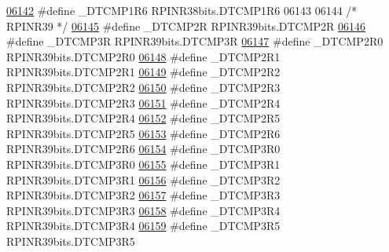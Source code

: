 \begin{DoxyCode}
\hypertarget{a00009_source_l06142}{}\hyperlink{a00009_a85c02708ed7aea8b18ad48ced7119c7e}{06142} \textcolor{preprocessor}{#define \_DTCMP1R6 RPINR38bits.DTCMP1R6}
06143 
06144 \textcolor{comment}{/* RPINR39 */}
\hypertarget{a00009_source_l06145}{}\hyperlink{a00009_abf4ddf38f361369065e1a7c2a2249b88}{06145} \textcolor{preprocessor}{#define \_DTCMP2R RPINR39bits.DTCMP2R}
\hypertarget{a00009_source_l06146}{}\hyperlink{a00009_ae1fca6ff210576b064e192b44a67b58f}{06146} \textcolor{preprocessor}{#define \_DTCMP3R RPINR39bits.DTCMP3R}
\hypertarget{a00009_source_l06147}{}\hyperlink{a00009_a2419cc0ce09311f6ce944ead78e2d6ac}{06147} \textcolor{preprocessor}{#define \_DTCMP2R0 RPINR39bits.DTCMP2R0}
\hypertarget{a00009_source_l06148}{}\hyperlink{a00009_a6d44d57831c926526ff5bb8f54c1d809}{06148} \textcolor{preprocessor}{#define \_DTCMP2R1 RPINR39bits.DTCMP2R1}
\hypertarget{a00009_source_l06149}{}\hyperlink{a00009_a4ef6402109846d1217ddc941f459c81c}{06149} \textcolor{preprocessor}{#define \_DTCMP2R2 RPINR39bits.DTCMP2R2}
\hypertarget{a00009_source_l06150}{}\hyperlink{a00009_ab7769feccd2440416945ab13f53d543f}{06150} \textcolor{preprocessor}{#define \_DTCMP2R3 RPINR39bits.DTCMP2R3}
\hypertarget{a00009_source_l06151}{}\hyperlink{a00009_ae90b7f8ab40564d4935fa89eb7dc3abc}{06151} \textcolor{preprocessor}{#define \_DTCMP2R4 RPINR39bits.DTCMP2R4}
\hypertarget{a00009_source_l06152}{}\hyperlink{a00009_af023b175fd3e46220e57f5acc9666c83}{06152} \textcolor{preprocessor}{#define \_DTCMP2R5 RPINR39bits.DTCMP2R5}
\hypertarget{a00009_source_l06153}{}\hyperlink{a00009_af6fe47daa8e7ecfb1420e0ef95c45e5d}{06153} \textcolor{preprocessor}{#define \_DTCMP2R6 RPINR39bits.DTCMP2R6}
\hypertarget{a00009_source_l06154}{}\hyperlink{a00009_a841f0ed8d060db59bf6991cf1ae99d61}{06154} \textcolor{preprocessor}{#define \_DTCMP3R0 RPINR39bits.DTCMP3R0}
\hypertarget{a00009_source_l06155}{}\hyperlink{a00009_a8c386e64e0dbf04f9723cb28bf9c6dec}{06155} \textcolor{preprocessor}{#define \_DTCMP3R1 RPINR39bits.DTCMP3R1}
\hypertarget{a00009_source_l06156}{}\hyperlink{a00009_ae9eb3830f44749c83cbe1fe742649ea9}{06156} \textcolor{preprocessor}{#define \_DTCMP3R2 RPINR39bits.DTCMP3R2}
\hypertarget{a00009_source_l06157}{}\hyperlink{a00009_afff9a4b9df40cad3fa8e099d0b8ff748}{06157} \textcolor{preprocessor}{#define \_DTCMP3R3 RPINR39bits.DTCMP3R3}
\hypertarget{a00009_source_l06158}{}\hyperlink{a00009_ab1b004a0379be0e98e6cab437e748ca1}{06158} \textcolor{preprocessor}{#define \_DTCMP3R4 RPINR39bits.DTCMP3R4}
\hypertarget{a00009_source_l06159}{}\hyperlink{a00009_ad555ca2099adfc3bf4c1635e64cc90d8}{06159} \textcolor{preprocessor}{#define \_DTCMP3R5 RPINR39bits.DTCMP3R5}

\end{DoxyCode}
